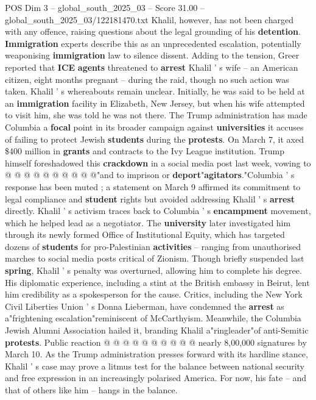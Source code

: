 \begin{textsample}{POS Dim 3 – global\_south\_2025\_03 – Score 31.00 – global\_south\_2025\_03/122181470.txt}
Khalil, however, has not been charged with any offence, raising questions about the legal grounding of his \textbf{detention}. \textbf{Immigration} experts describe this as an unprecedented escalation, potentially weaponising \textbf{immigration} law to silence dissent.
Adding to the tension, Greer reported that \textbf{ICE} \textbf{agents} threatened to \textbf{arrest} Khalil ' s wife -- an American citizen, eight months pregnant -- during the raid, though no such action was taken.
Khalil ' s whereabouts remain unclear.
Initially, he was said to be held at an \textbf{immigration} facility in Elizabeth, New Jersey, but when his wife attempted to visit him, she was told he was not there.
The Trump administration has made Columbia a \textbf{focal} point in its broader campaign against \textbf{universities} it accuses of failing to protect Jewish \textbf{students} during the \textbf{protests}.
On March 7, it axed \$400 million in \textbf{grants} and contracts to the Ivy League institution.
Trump himself foreshadowed this \textbf{crackdown} in a social media post last week, vowing to @ @ @ @ @ @ @ @ @ @"and to imprison or \textbf{deport}"\textbf{agitators}."Columbia ' s response has been muted ; a statement on March 9 affirmed its commitment to legal compliance and \textbf{student} rights but avoided addressing Khalil ' s \textbf{arrest} directly.
Khalil ' s activism traces back to Columbia ' s \textbf{encampment} movement, which he helped lead as a negotiator.
The \textbf{university} later investigated him through its newly formed Office of Institutional Equity, which has targeted dozens of \textbf{students} for pro-Palestinian \textbf{activities} -- ranging from unauthorised marches to social media posts critical of Zionism.
Though briefly suspended last \textbf{spring}, Khalil ' s penalty was overturned, allowing him to complete his degree.
His diplomatic experience, including a stint at the British embassy in Beirut, lent him credibility as a spokesperson for the cause.
Critics, including the New York Civil Liberties Union ' s Donna Lieberman, have condemned the \textbf{arrest} as a"frightening escalation"reminiscent of McCarthyism.
Meanwhile, the Columbia Jewish Alumni Association hailed it, branding Khalil a"ringleader"of anti-Semitic \textbf{protests}.
Public reaction @ @ @ @ @ @ @ @ @ @ nearly 8,00,000 signatures by March 10.
As the Trump administration presses forward with its hardline stance, Khalil ' s case may prove a litmus test for the balance between national security and free expression in an increasingly polarised America.
For now, his fate -- and that of others like him -- hangs in the balance.

\end{textsample}
